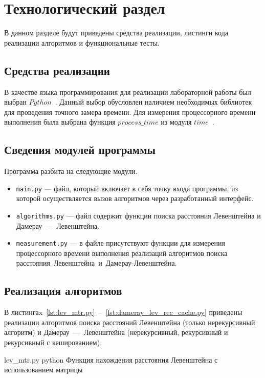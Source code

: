 \chapter{Технологический раздел}

В данном разделе будут приведены средства реализации, листинги кода реализации алгоритмов и функциональные тесты.

\section{Средства реализации}

В качестве языка программирования для реализации лабораторной работы был выбран $Python$~\cite{python-lang}. 
Данный выбор обусловлен наличием необходимых библиотек для проведения точного замера времени. 
Для измерения процессорного времени выполнения была выбрана функция $process\_time$ из модуля $time$~\cite{python-time}.

\section{Сведения модулей программы}

Программа разбита на следующие модули.

\begin{itemize}
	\item \texttt{main.py} --- файл, который включает в себя точку входа программы, из которой осуществляется вызов алгоритмов через разработанный интерфейс.
	\item \texttt{algorithms.py} --- файл содержит функции поиска расстояния Левенштейна и Дамерау~---~Левенштейна.
	\item \texttt{measurement.py} --- в файле присутствуют функции для измерения процессорного времени выполнения реализаций алгоритмов поиска расстояния~Левенштейна~и~Дамерау-Левенштейна. 
\end{itemize}

\section{Реализация алгоритмов}

В листингаx~\ref{lst:lev_mtr.py}~--~\ref{lst:dameray_lev_rec_cache.py} приведены реализации алгоритмов поиска расстояний Левенштейна (только нерекурсивный алгоритм) и Дамерау~---~Левенштейна (нерекурсивный, рекурсивный и рекурсивный с кешированием).

\newpage
{}
	{lev_mtr.py} %
	{python} %
	{Функция нахождения расстояния Левенштейна с использованием матрицы} %

